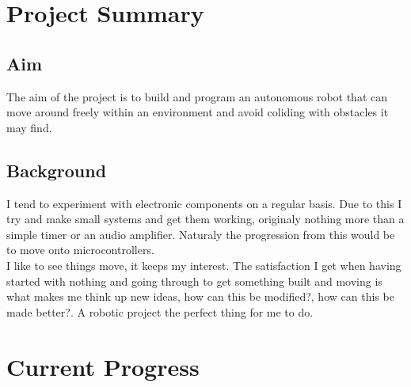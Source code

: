 \documentclass[11pt,fleqn,twoside]{article}
\begin{document}

\mmp

\setcounter{tocdepth}{3} %
\tableofcontents

\newpage

\section{Project Summary}
\subsection{Aim}
The aim of the project is to build and program an autonomous robot that can move around freely within an environment and avoid coliding with obstacles it may find.
\subsection{Background}
I tend to experiment with electronic components on a regular basis.  Due to this I try and make small systems and get them working, originaly nothing more than a simple timer or an audio amplifier.  Naturaly the progression from this would be to move onto microcontrollers.
\\I like to see things move, it keeps my interest.  The satisfaction I get when having started with nothing and going through to get something built and moving is what makes me think up new ideas, how can this be modified?, how can this be made better?.  A robotic project the perfect thing for me to do.
\\

\section{Current Progress}
\end{document}
